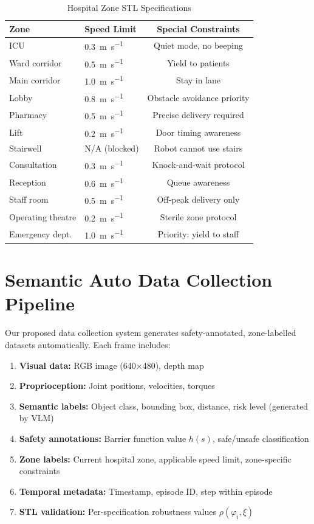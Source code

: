 \documentclass[conference]{IEEEtran}
\begin{document}
\begin{table}[h]
\centering
\caption{Hospital Zone STL Specifications}
\begin{tabular}{@{}llc@{}}
\toprule
\textbf{Zone} & \textbf{Speed Limit} & \textbf{Special Constraints} \\
\midrule
ICU & \SI{0.3}{\metre\per\second} & Quiet mode, no beeping \\
Ward corridor & \SI{0.5}{\metre\per\second} & Yield to patients \\
Main corridor & \SI{1.0}{\metre\per\second} & Stay in lane \\
Lobby & \SI{0.8}{\metre\per\second} & Obstacle avoidance priority \\
Pharmacy & \SI{0.5}{\metre\per\second} & Precise delivery required \\
Lift & \SI{0.2}{\metre\per\second} & Door timing awareness \\
Stairwell & N/A (blocked) & Robot cannot use stairs \\
Consultation & \SI{0.3}{\metre\per\second} & Knock-and-wait protocol \\
Reception & \SI{0.6}{\metre\per\second} & Queue awareness \\
Staff room & \SI{0.5}{\metre\per\second} & Off-peak delivery only \\
Operating theatre & \SI{0.2}{\metre\per\second} & Sterile zone protocol \\
Emergency dept. & \SI{1.0}{\metre\per\second} & Priority: yield to staff \\
\bottomrule
\end{tabular}
\end{table}

\section{Semantic Auto Data Collection Pipeline}
\label{sec:supp_datacollection}

Our proposed data collection system generates safety-annotated, zone-labelled datasets automatically. Each frame includes:

\begin{enumerate}
    \item \textbf{Visual data:} RGB image (640$\times$480), depth map
    \item \textbf{Proprioception:} Joint positions, velocities, torques
    \item \textbf{Semantic labels:} Object class, bounding box, distance, risk level (generated by VLM)
    \item \textbf{Safety annotations:} Barrier function value $h(s)$, safe/unsafe classification
    \item \textbf{Zone labels:} Current hospital zone, applicable speed limit, zone-specific constraints
    \item \textbf{Temporal metadata:} Timestamp, episode ID, step within episode
    \item \textbf{STL validation:} Per-specification robustness values $\rho(\varphi_i, \xi)$
\end{enumerate}
\end{document}
